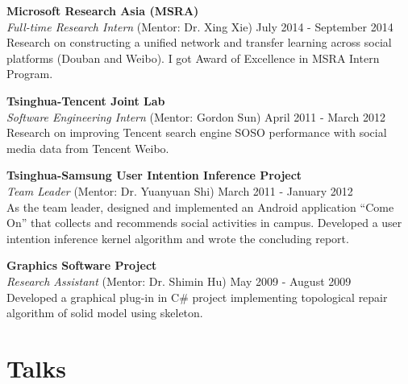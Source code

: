 \documentclass[margin, 10pt]{res} %
\begin{document}
\begin{resume}
{\bf Microsoft Research Asia (MSRA)} \\
{\em Full-time Research Intern} (Mentor: Dr. Xing Xie) \hfill {July 2014 - September 2014} \\
Research on constructing a unified network and transfer learning across social platforms (Douban and Weibo).
I got Award of Excellence in MSRA Intern Program.

{\bf Tsinghua-Tencent Joint Lab} \\
{\em Software Engineering Intern} (Mentor: Gordon Sun) \hfill {April 2011 - March 2012} \\
Research on improving Tencent search engine SOSO performance with social media data from Tencent Weibo.

{\bf Tsinghua-Samsung User Intention Inference Project} \\
{\em Team Leader} (Mentor: Dr. Yuanyuan Shi) \hfill {March 2011 - January 2012} \\
As the team leader, designed and implemented an Android application ``Come On'' that collects and recommends social activities in campus.
Developed a user intention inference kernel algorithm and wrote the concluding report.

{\bf Graphics Software Project} \\
{\em Research Assistant} (Mentor: Dr. Shimin Hu) \hfill {May 2009 - August 2009} \\
Developed a graphical plug-in in C\# project implementing topological repair algorithm of solid model using skeleton.




\section{Talks}


\end{resume}
\end{document}

